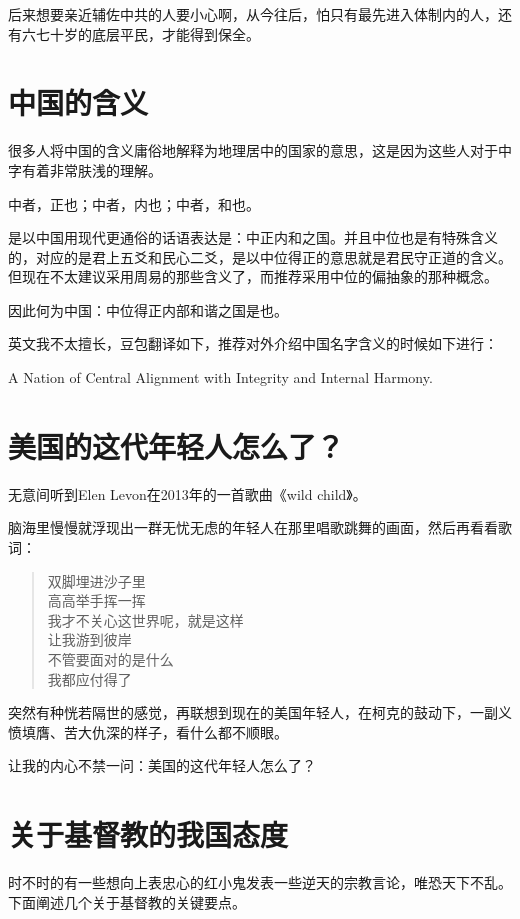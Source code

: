 \documentclass[12pt,oneside]{book}
\newenvironment{shici}{%
\begin{verse}%
\centering\large\hspace{12pt}}%
{\end{verse}}
\begin{document}
后来想要亲近辅佐中共的人要小心啊，从今往后，怕只有最先进入体制内的人，还有六七十岁的底层平民，才能得到保全。


\chapter{中国的含义}
很多人将中国的含义庸俗地解释为地理居中的国家的意思，这是因为这些人对于中字有着非常肤浅的理解。

中者，正也；中者，内也；中者，和也。

是以中国用现代更通俗的话语表达是：中正内和之国。并且中位也是有特殊含义的，对应的是君上五爻和民心二爻，是以中位得正的意思就是君民守正道的含义。但现在不太建议采用周易的那些含义了，而推荐采用中位的偏抽象的那种概念。

因此何为中国：中位得正内部和谐之国是也。

英文我不太擅长，豆包翻译如下，推荐对外介绍中国名字含义的时候如下进行：

A Nation of Central Alignment with Integrity and Internal Harmony.

\chapter{美国的这代年轻人怎么了？}
无意间听到Elen Levon在2013年的一首歌曲《wild child》。

脑海里慢慢就浮现出一群无忧无虑的年轻人在那里唱歌跳舞的画面，然后再看看歌词：

\begin{shici}
双脚埋进沙子里\\
高高举手挥一挥\\
我才不关心这世界呢，就是这样\\
让我游到彼岸\\
不管要面对的是什么\\
我都应付得了\\
\end{shici}

突然有种恍若隔世的感觉，再联想到现在的美国年轻人，在柯克的鼓动下，一副义愤填膺、苦大仇深的样子，看什么都不顺眼。

让我的内心不禁一问：美国的这代年轻人怎么了？

\chapter{关于基督教的我国态度}
时不时的有一些想向上表忠心的红小鬼发表一些逆天的宗教言论，唯恐天下不乱。下面阐述几个关于基督教的关键要点。
\end{document}
